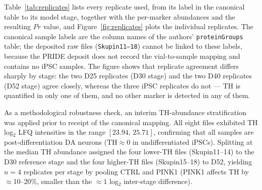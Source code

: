 \documentclass[5p,times,twocolumn]{elsarticle}
\newcommand{\rtag}[1]{}
\newenvironment{revblock}[1]{\par\rtag{#1}\ignorespaces}{\par}
\newcommand{\lang}[1]{#1}
\begin{document}
\begin{revblock}{R2.5,R2.11}
  Table~\ref{tab:replicates} lists every replicate used, from
  its label in the canonical table to its model stage, together
  with the per-marker abundances and the resulting $Pr$ value,
  and Figure~\ref{fig:replicates} plots the individual
  replicates.
  The canonical sample labels are the column names of the
  authors' \texttt{proteinGroups} table; the deposited raw files
  (\texttt{Skupin11--18}) cannot be linked to these labels,
  because the PRIDE deposit does not record the vial-to-sample
  mapping and contains no iPSC samples.
  The figure shows that replicate agreement differs sharply by
  stage: the two D25 replicates (D30 stage) and the two D40
  replicates (D52 stage) agree closely, whereas the three iPSC
  replicates do not --- TH is quantified in only one of them,
  and no other marker is detected in any of them.
\end{revblock}



As a methodological robustness check, an interim
TH-abundance stratification was applied prior to receipt
of the canonical mapping.
All eight files exhibited TH log$_{2}$ LFQ intensities in
the range $[23.94,\,25.71]$, confirming \lang{that} all samples are
post-differentiation DA neurons ($\text{TH} \approx 0$
in undifferentiated iPSCs).
Splitting at the median TH abundance assigned the four
lower-TH files (Skupin11--14) to the D30 reference stage
and the four higher-TH files (Skupin15--18) to D52,
yielding $n = 4$ replicates per stage by pooling CTRL and
PINK1 (PINK1 affects TH by $\approx$10--20\%, smaller than
the $\approx 1$ log$_{2}$ inter-stage difference).
\end{document}
